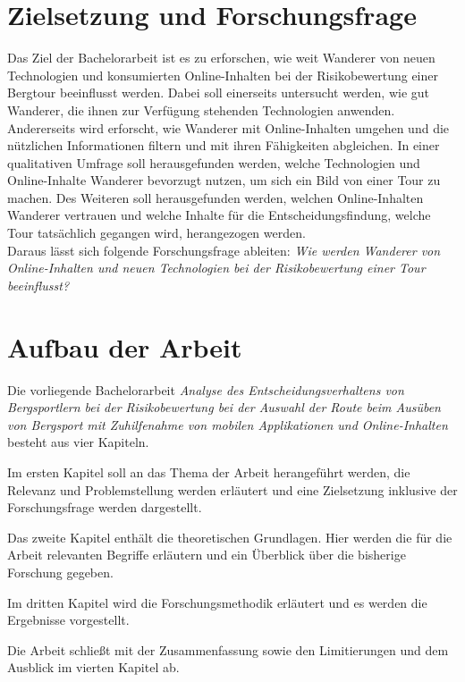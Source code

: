 \section{Zielsetzung und Forschungsfrage}


Das Ziel der Bachelorarbeit ist es zu erforschen, wie weit  Wanderer von neuen Technologien und konsumierten Online-Inhalten bei der Risikobewertung einer Bergtour beeinflusst werden. Dabei soll einerseits untersucht werden, wie gut Wanderer, die ihnen zur Verfügung stehenden Technologien anwenden. Andererseits wird erforscht, wie Wanderer mit Online-Inhalten umgehen und die nützlichen Informationen filtern und mit ihren Fähigkeiten abgleichen. In einer qualitativen Umfrage soll herausgefunden werden, welche Technologien und Online-Inhalte Wanderer bevorzugt nutzen, um sich ein Bild von einer Tour zu machen. Des Weiteren soll herausgefunden werden, welchen Online-Inhalten Wanderer vertrauen und welche Inhalte für die Entscheidungsfindung, welche Tour tatsächlich gegangen wird, herangezogen werden.\\
Daraus lässt sich folgende Forschungsfrage ableiten: 
\textit{Wie werden Wanderer von Online-Inhalten und neuen Technologien bei der Risikobewertung einer Tour beeinflusst?}

\section{Aufbau der Arbeit}

Die vorliegende Bachelorarbeit \textit{Analyse des Entscheidungsverhaltens von Bergsportlern bei der Risikobewertung bei der Auswahl der Route beim Ausüben von Bergsport mit Zuhilfenahme von mobilen Applikationen und Online-Inhalten} besteht aus vier Kapiteln.\par

Im ersten Kapitel soll an das Thema der Arbeit herangeführt werden, die Relevanz und Problemstellung werden erläutert und eine Zielsetzung inklusive der Forschungsfrage werden dargestellt.\par

Das zweite Kapitel enthält die theoretischen Grundlagen. Hier werden die für die Arbeit relevanten Begriffe erläutern und ein Überblick über die bisherige Forschung gegeben.\par

Im dritten Kapitel wird die Forschungsmethodik erläutert und es werden die Ergebnisse vorgestellt.

 Die Arbeit schließt mit der Zusammenfassung sowie den Limitierungen und dem Ausblick im vierten Kapitel ab.


